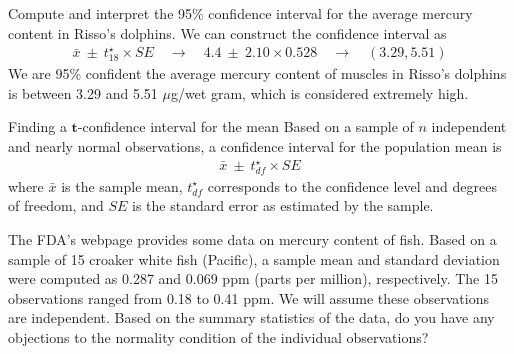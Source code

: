 

\begin{examplewrap}
\begin{nexample}{Compute and interpret the 95\% confidence interval
    for the average mercury content in Risso's dolphins.}
  We can construct the confidence interval as
  \begin{align*}
  \bar{x} \ \pm\  t^{\star}_{18} \times SE
    \quad \to \quad 4.4 \ \pm\  2.10 \times 0.528
    \quad \to \quad (3.29, 5.51)
  \end{align*}
  We are 95\% confident the average mercury content of muscles
  in Risso's dolphins is between 3.29 and 5.51 $\mu$g/wet gram,
  which is considered extremely high.
\end{nexample}
\end{examplewrap}


\begin{onebox}{Finding a $\mathbf{t}$-confidence interval
    for the mean}
  Based on a sample of $n$ independent and nearly normal
  observations, a confidence interval for the population
  mean is
  \begin{align*}
  \bar{x} \ \pm\  t^{\star}_{df} \times SE
  \end{align*}
  where $\bar{x}$ is the sample mean, $t^{\star}_{df}$
  corresponds to the confidence level and degrees of freedom,
  and $SE$ is the standard error as estimated by the sample.
\end{onebox}

\begin{exercisewrap}
\begin{nexercise} \label{croakerWhiteFishPacificExerConditions}
The FDA's webpage provides some data on mercury content of fish.
Based on a sample of 15 croaker white fish (Pacific),
a sample mean and standard deviation were computed as 0.287
and 0.069 ppm (parts per million), respectively.
The 15 observations ranged from 0.18 to 0.41 ppm.
We will assume these observations are independent.
Based on the summary statistics of the data,
do you have any objections to the normality condition
of the individual observations?\footnotemark{}
\end{nexercise}
\end{exercisewrap}


